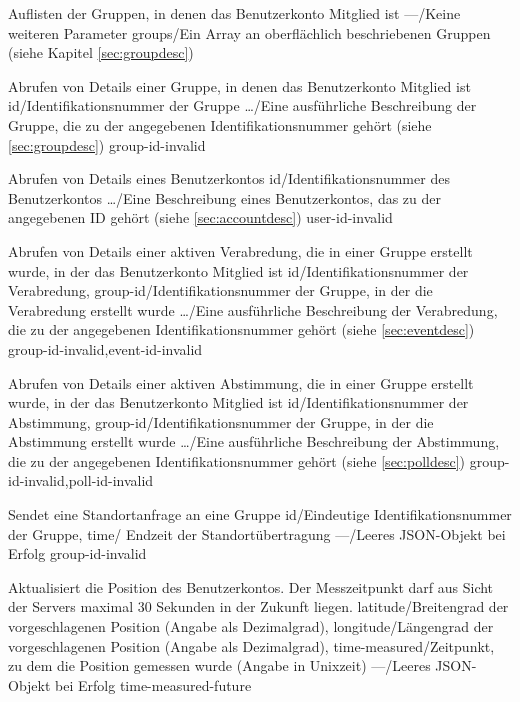 \documentclass[parskip=full,11pt]{scrartcl}
\begin{document}
{Auflisten der Gruppen, in denen das Benutzerkonto Mitglied ist}
{---/Keine weiteren Parameter}
{groups/Ein Array an oberflächlich beschriebenen Gruppen (siehe
Kapitel \ref{sec:groupdesc})}
{}

{Abrufen von Details einer Gruppe, in denen das Benutzerkonto Mitglied ist}
{id/Identifikationsnummer der Gruppe}
{\dots/Eine ausführliche Beschreibung der Gruppe{,} die zu der angegebenen
Identifikationsnummer gehört (siehe \ref{sec:groupdesc})}
{group-id-invalid}

{Abrufen von Details eines Benutzerkontos}
{id/Identifikationsnummer des Benutzerkontos}
{\dots/Eine Beschreibung eines Benutzerkontos{,} das zu der angegebenen
ID gehört (siehe \ref{sec:accountdesc})}
{user-id-invalid}

{Abrufen von Details einer aktiven Verabredung, die in einer Gruppe erstellt
wurde, in der das Benutzerkonto Mitglied ist}
{id/Identifikationsnummer der Verabredung,
group-id/Identifikationsnummer der Gruppe{,} in der die Verabredung erstellt
wurde}
{\dots/Eine ausführliche Beschreibung der Verabredung{,} die zu der angegebenen
Identifikationsnummer gehört (siehe \ref{sec:eventdesc})}
{group-id-invalid,event-id-invalid}

{Abrufen von Details einer aktiven Abstimmung, die in einer Gruppe erstellt
wurde, in der das Benutzerkonto Mitglied ist}
{id/Identifikationsnummer der Abstimmung,
group-id/Identifikationsnummer der Gruppe{,} in der die Abstimmung erstellt
wurde}
{\dots/Eine ausführliche Beschreibung der Abstimmung{,} die zu der angegebenen
Identifikationsnummer gehört (siehe \ref{sec:polldesc})}
{group-id-invalid,poll-id-invalid}

{Sendet eine Standortanfrage an eine Gruppe}
{id/Eindeutige Identifikationsnummer der Gruppe,
time/ Endzeit der Standortübertragung}
{---/Leeres JSON-Objekt bei Erfolg}
{group-id-invalid}

{Aktualisiert die Position des Benutzerkontos.
Der Messzeitpunkt darf aus Sicht der Servers maximal 30 Sekunden in der Zukunft
liegen.}
{latitude/Breitengrad der vorgeschlagenen Position (Angabe als Dezimalgrad),
longitude/Längengrad der vorgeschlagenen Position (Angabe als Dezimalgrad),
time-measured/Zeitpunkt{,} zu dem die Position gemessen wurde (Angabe in
Unixzeit)}
{---/Leeres JSON-Objekt bei Erfolg}
{time-measured-future}
\end{document}
